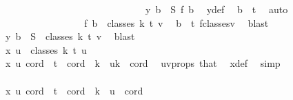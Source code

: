 \begin{isabellebody}
\ \ \ \ \ \ \ \ \ \ \ \ \isamarkupfalse%
\ {\isacharminus}{\kern0pt}\isanewline
\ \ \ \ \ \ \ \ \ \ \ \ \ \ \isamarkupfalse%
\ {\isachardoublequoteopen}y\ b\ {\isacharequal}{\kern0pt}\ S\ {\isacharparenleft}{\kern0pt}{\isacharquery}{\kern0pt}f\ b{\isacharparenright}{\kern0pt}{\isachardoublequoteclose}\ \isamarkupfalse%
\ y{\isacharunderscore}{\kern0pt}def\ \isamarkupfalse%
\ {\isacartoucheopen}b\ {\isacharequal}{\kern0pt}\ t{\isacartoucheclose}\ \isamarkupfalse%
\ auto\isanewline
\ \ \ \ \ \ \ \ \ \ \ \ \ \ \isamarkupfalse%
\ \isamarkupfalse%
\ {\isachardoublequoteopen}{\isacharquery}{\kern0pt}f\ b\ {\isasymin}\ classes\ k\ t\ v{\isachardoublequoteclose}\ \isamarkupfalse%
\ {\isacartoucheopen}b\ {\isacharequal}{\kern0pt}\ t{\isacartoucheclose}\ f{\isacharunderscore}{\kern0pt}classes{\isacharunderscore}{\kern0pt}v\ \isamarkupfalse%
\ blast\isanewline
\ \ \ \ \ \ \ \ \ \ \ \ \ \ \isamarkupfalse%
\ \isamarkupfalse%
\ {\isachardoublequoteopen}y\ b\ {\isasymin}\ S\ {\isacharbackquote}{\kern0pt}\ classes\ k\ t\ v{\isachardoublequoteclose}\ \isamarkupfalse%
\ blast\isanewline
\ \ \ \ \ \ \ \ \ \ \ \ \isamarkupfalse%
\isanewline
\ \ \ \ \ \ \ \ \ \ \ \ \isamarkupfalse%
\ \isamarkupfalse%
\ {\isachardoublequoteopen}x\ u\ {\isasymin}\ classes\ k\ t\ u{\isachardoublequoteclose}\isanewline
\ \ \ \ \ \ \ \ \ \ \ \ \isamarkupfalse%
\ {\isacharminus}{\kern0pt}\isanewline
\ \ \ \ \ \ \ \ \ \ \ \ \ \ \isamarkupfalse%
\ {\isachardoublequoteopen}x\ u\ cord\ {\isacharequal}{\kern0pt}\ t{\isachardoublequoteclose}\ \ {\isachardoublequoteopen}cord\ {\isasymin}\ {\isacharbraceleft}{\kern0pt}k\ {\isacharminus}{\kern0pt}\ u{\isachardot}{\kern0pt}{\isachardot}{\kern0pt}{\isacharless}{\kern0pt}k{\isacharbraceright}{\kern0pt}{\isachardoublequoteclose}\ \ cord\ \isamarkupfalse%
\ uv{\isacharunderscore}{\kern0pt}props\ that\ \isamarkupfalse%
\ x{\isacharunderscore}{\kern0pt}def\ \isamarkupfalse%
\ simp\ \isanewline
\ \ \ \ \ \ \ \ \ \ \ \ \ \ \isamarkupfalse%
\ \isanewline
\ \ \ \ \ \ \ \ \ \ \ \ \ \ \isacommand{{\isacharbraceleft}{\kern0pt}}\isamarkupfalse%
\ \ \isanewline
\ \ \ \ \ \ \ \ \ \ \ \ \ \ \ \ \isamarkupfalse%
\ {\isachardoublequoteopen}x\ u\ cord\ {\isasymnoteq}\ t{\isachardoublequoteclose}\ \ {\isachardoublequoteopen}cord\ {\isasymin}\ {\isacharbraceleft}{\kern0pt}{\isachardot}{\kern0pt}{\isachardot}{\kern0pt}{\isacharless}{\kern0pt}k\ {\isacharminus}{\kern0pt}\ u{\isacharbraceright}{\kern0pt}{\isachardoublequoteclose}\ \ cord\ \isamarkupfalse%

\end{isabellebody}
